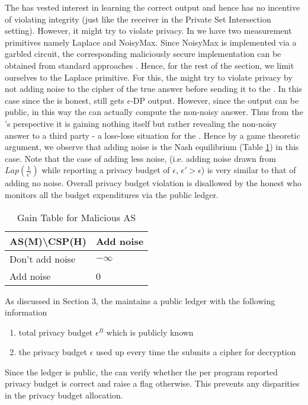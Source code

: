 The \AS has vested interest in learning the correct output and hence has no incentive of violating integrity (just like the receiver in the Private Set Intersection setting).
 However, it might try to violate privacy. In \system we have two measurement primitives namely \textsf{Laplace} and \textsf{NoisyMax}. Since \textsf{NoisyMax} is implemented via a garbled circuit, the corresponding maliciously secure implementation can be obtained from standard approaches \cite{Wang:2017:AGE:3133956.3134053}. Hence, for the rest of the section, we limit ourselves to the \textsf{Laplace} primitive. For this, the \AS might try to violate privacy by not adding noise to the cipher of the true answer before sending it to the \CSP. In this case since the \CSP is honest, \AS still gets $\epsilon$-DP output.
However, since the output can be public, in this way the \CSP can actually compute the non-noisy answer.
Thus from the \AS's perspective it is gaining nothing itself but rather revealing the non-noisy answer to a third party \CSP - a lose-lose situation for the \AS. Hence by a game theoretic argument, we observe that adding noise is the Nash equilibrium (Table \ref{tab:Malicous_AS}) in this case.
Note that the case of adding less noise, (i.e. adding noise drawn from $Lap(\frac{1}{\epsilon'})$ while reporting a privacy budget of $\epsilon$, $\epsilon' > \epsilon$) is very similar to that of adding no noise.
Overall privacy budget violation is disallowed by the honest \CSP who monitors all the budget expenditures via the public ledger.
\begin{table}\caption{Gain Table for Malicious AS}
\begin{tabular}{|l|l|}
\hline
AS(M)\textbackslash CSP(H) & Add noise\\
\hline
 Don't add noise& $-\infty$    \\\hline
 Add noise & 0   \\
 \hline
\end{tabular}\label{tab:Malicous_AS}
\end{table}

As discussed in Section 3, the \CSP maintains a public ledger with the following information
\begin{enumerate}\item  total privacy budget $\epsilon^B$ which is publicly known
\item the privacy budget $\epsilon$ used up every time the \AS submits a cipher for decryption
\end{enumerate}
Since the ledger is public, the \AS can verify whether the per program reported privacy budget is correct and raise a flag otherwise. This prevents any disparities in the privacy budget allocation.

